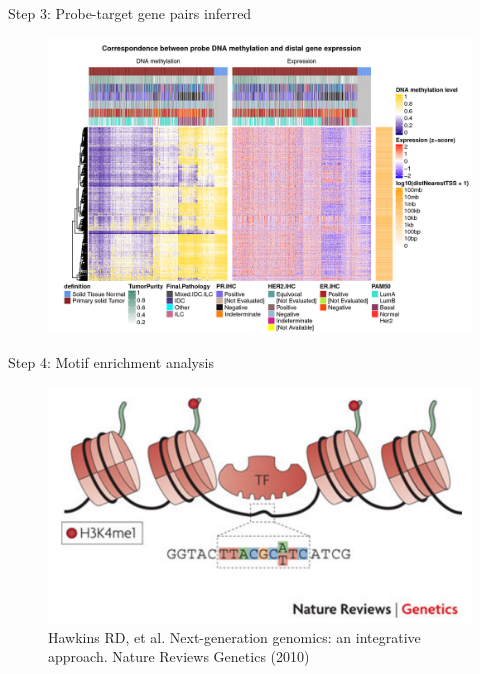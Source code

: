 \documentclass[slidestop,compress,11pt,xcolor=dvipsnames]{beamer}
\begin{document}
\begin{frame}{Step 3: Probe-target gene pairs inferred}
 \vspace*{-0.3cm}
 \begin{figure}
  \centering
  \includegraphics[width=1.0\linewidth]{ELMER/heatmappair.jpg}
 \end{figure}
\end{frame}


\begin{frame}{Step 4: Motif enrichment analysis}

 \vspace*{-0.3cm}
 \begin{figure}
  \centering
  \includegraphics[width=1.0\linewidth]{ELMER/tf_binding.png}{\tiny{\\Hawkins RD, et al. Next-generation genomics: an integrative approach. Nature Reviews Genetics (2010)}}
 \end{figure}
\end{frame}
\end{document}
